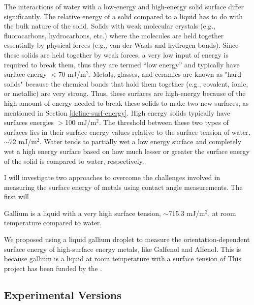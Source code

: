 The interactions of water with a low-energy and high-energy solid surface differ significantly. The relative energy of a solid compared to a liquid has to do with the bulk nature of the solid. Solids with weak molecular crystals (e.g., fluorocarbons, hydrocarbons, etc.) where the molecules are held together essentially by physical forces (e.g., van der Waals and hydrogen bonds). Since these solids are held together by weak forces, a very low input of energy is required to break them, thus they are termed “low energy” and typically have surface energy $<$70 mJ/m$^2$.  Metals, glasses, and ceramics are known as "hard solids" because the chemical bonds that hold them together (e.g., covalent, ionic, or metallic) are very strong. Thus, these surfaces are high-energy because of the high amount of energy needed to break these solids to make two new surfaces, as mentioned in Section \ref{define-surf-energy}. High energy solids typically have surfaces energies $>$100 mJ/m$^2$.  The threshold between these two types of surfaces lies in their surface energy values relative to the surface tension of water, $\sim$72 mJ/m$^2$. Water tends to partially wet a low energy surface and completely wet a high energy surface based on how much lesser or greater the surface energy of the solid is compared to water, respectively. 

I will investigate two approaches to overcome the challenges involved in measuring the surface energy of metals using contact angle measurements. The first will 

Gallium is a liquid with a very high surface tension, $\sim$715.3 mJ/m$^2$, at room temperature compared to water. 

We proposed using a liquid gallium droplet to measure the orientation-dependent surface energy of high-surface energy metals, like Galfenol and Alfenol. This is because gallium is a liquid at room temperature with a surface tension of This project has been funded by the \NSF. 




\subsection{Experimental Versions}



